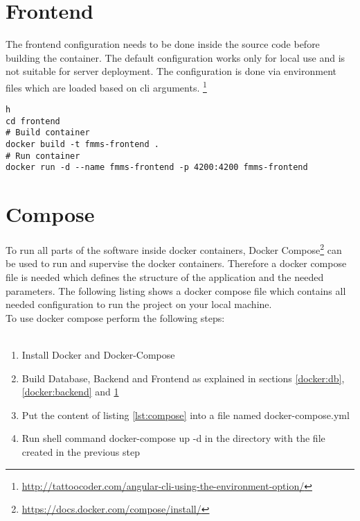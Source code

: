 \section{Frontend}
\label{docker:frontend}

The frontend configuration needs to be done inside the source code before building the container.
The default configuration works only for local use and is not suitable for server deployment.
The configuration is done via environment files which are loaded based on cli arguments. \footnote{\url{http://tattoocoder.com/angular-cli-using-the-environment-option/}}


\begin{minipage}{\textwidth}
\begin{lstlisting}[caption={Build Frontend Container}]h
cd frontend
# Build container
docker build -t fmms-frontend .
# Run container
docker run -d --name fmms-frontend -p 4200:4200 fmms-frontend
\end{lstlisting}
\end{minipage}




\section{Compose}
\label{docker:compose}
To run all parts of the software inside docker containers, Docker Compose\footnote{\url{https://docs.docker.com/compose/install/}} can be used to run and supervise the docker containers.
Therefore a docker compose file is needed which defines the structure of the application and the needed parameters.
The following listing shows a docker compose file which contains all needed configuration to run the project on your local machine.
~\\
To use docker compose perform the following steps: \\ \\
\begin{minipage}{\textwidth}
\begin{enumerate}
	\item Install Docker and Docker-Compose
	\item Build Database, Backend and Frontend as explained in sections \ref{docker:db}, \ref{docker:backend} and \ref{docker:frontend}
	\item Put the content of listing \ref{lst:compose} into a file named \glqq docker-compose.yml\grqq
	\item Run shell command \glqq docker-compose up -d\grqq{} in the directory with the file created in the previous step
\end{enumerate}
\end{minipage}

\begin{minipage}{\textwidth}
	
\end{minipage}
